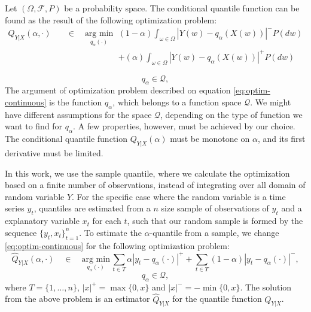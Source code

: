 Let $(\Omega, \mathcal{F}, P)$ be a probability space. The conditional quantile function can be found as the result of the following optimization problem:
\begin{eqnarray}
Q_{Y|X}(\alpha, \cdot)\quad & \in\quad\underset{q_\alpha(\cdot)}{\text{arg min}}\, &
(1-\alpha)\int_{\omega \in \Omega}|Y(w)-q_\alpha(X(w))|^{-}P(dw) \label{eq:optim-continuous}
 \\ & & + (\alpha)\int_{\omega \in \Omega}|Y(w)-q_\alpha(X(w))|^{+}P(dw) \nonumber
\end{eqnarray}

\begin{equation}
  q_\alpha  \in \mathcal{Q},
\end{equation}
 The argument of optimization problem described on equation \ref{eq:optim-continuous} is the function $q_\alpha$, which belongs to a function space $\mathcal{Q}$. We might have different assumptions for the space $\mathcal{Q}$, depending on the type of function we want to find for $q_\alpha$. A few properties, however, must be achieved by our choice. The conditional quantile function $Q_{Y|X}(\alpha)$ must be monotone on $\alpha$, and its first derivative must be limited.

In this work, we use the sample quantile,  where we calculate the optimization based on a finite number of observations, instead of integrating over all domain of random variable $Y$. For the specific case where the random variable is a time series $y_t$, quantiles are estimated from a $n$ size sample of observations of $y_t$ and a explanatory variable $x_t$ for each $t$, such that our random sample is formed by the sequence $\{y_t,x_t \}_{t=1}^n$. To estimate the $\alpha$-quantile from a sample, we change \ref{eq:optim-continuous} for the following optimization problem:
\begin{equation}
\hat{Q}_{Y|X}(\alpha, \cdot)\quad \in\quad\underset{q_\alpha(\cdot)}{\text{arg min}}\,\sum_{t \in T}\alpha|y_{t}-q_\alpha(\cdot)|^{+}+\sum_{t \in T}(1-\alpha)|y_{t}-q_\alpha(\cdot)|^{-},
\label{eq:linear-model}
\end{equation}
\begin{equation}
  q_\alpha  \in \mathcal{Q},
\end{equation}
where $T = \{1, \dots, n \}$, $|x|^+=\max\{0,x\}$ and $|x|^-=-\min\{0,x\}$. The solution from the above problem is an estimator $\hat{Q}_{Y|X}$ for the quantile function $Q_{Y|X}$.

